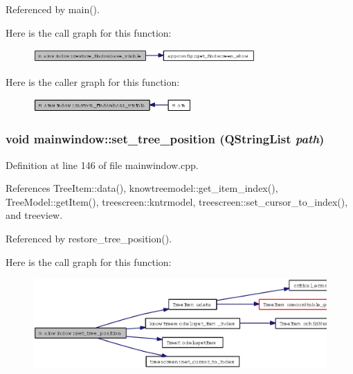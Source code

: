 Referenced by main().

Here is the call graph for this function:\begin{figure}[H]
\begin{center}
\leavevmode
\includegraphics[width=241pt]{classmainwindow_676fda5aa4ca3b8d2d57c4521d69f00b_cgraph}
\end{center}
\end{figure}


Here is the caller graph for this function:\begin{figure}[H]
\begin{center}
\leavevmode
\includegraphics[width=172pt]{classmainwindow_676fda5aa4ca3b8d2d57c4521d69f00b_icgraph}
\end{center}
\end{figure}
\subsubsection{\setlength{\rightskip}{0pt plus 5cm}void mainwindow::set\_\-tree\_\-position (QString\-List {\em path})}\label{classmainwindow_1ea5fc01161f568df189d539468a31b5}




Definition at line 146 of file mainwindow.cpp.

References Tree\-Item::data(), knowtreemodel::get\_\-item\_\-index(), Tree\-Model::get\-Item(), treescreen::kntrmodel, treescreen::set\_\-cursor\_\-to\_\-index(), and treeview.

Referenced by restore\_\-tree\_\-position().

Here is the call graph for this function:\begin{figure}[H]
\begin{center}
\leavevmode
\includegraphics[width=333pt]{classmainwindow_1ea5fc01161f568df189d539468a31b5_cgraph}
\end{center}
\end{figure}


